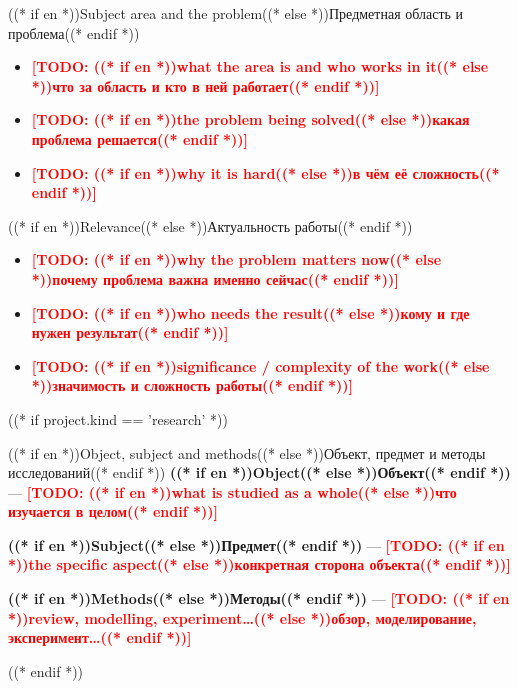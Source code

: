 \documentclass[aspectratio=169, 14pt]{beamer}
\newcommand{\todo}[1]{\textcolor{red}{\textbf{[TODO: #1]}}}
\begin{document}
\begin{frame}{((* if en *))Subject area and the problem((* else *))Предметная область и проблема((* endif *))}
  \begin{itemize}
    \item \todo{((* if en *))what the area is and who works in it((* else *))что за область и кто в ней работает((* endif *))}
    \item \todo{((* if en *))the problem being solved((* else *))какая проблема решается((* endif *))}
    \item \todo{((* if en *))why it is hard((* else *))в чём её сложность((* endif *))}
  \end{itemize}
\end{frame}

\begin{frame}{((* if en *))Relevance((* else *))Актуальность работы((* endif *))}
  \begin{itemize}
    \item \todo{((* if en *))why the problem matters now((* else *))почему проблема важна именно сейчас((* endif *))}
    \item \todo{((* if en *))who needs the result((* else *))кому и где нужен результат((* endif *))}
    \item \todo{((* if en *))significance / complexity of the work((* else *))значимость и сложность работы((* endif *))}
  \end{itemize}
\end{frame}

((* if project.kind == 'research' *))
\begin{frame}{((* if en *))Object, subject and methods((* else *))Объект, предмет и методы исследований((* endif *))}
  \textcolor{hseblue}{\textbf{((* if en *))Object((* else *))Объект((* endif *))}} — \todo{((* if en *))what is studied as a whole((* else *))что изучается в целом((* endif *))}

  \smallskip
  \textcolor{hseblue}{\textbf{((* if en *))Subject((* else *))Предмет((* endif *))}} — \todo{((* if en *))the specific aspect((* else *))конкретная сторона объекта((* endif *))}

  \smallskip
  \textcolor{hseblue}{\textbf{((* if en *))Methods((* else *))Методы((* endif *))}} — \todo{((* if en *))review, modelling, experiment…((* else *))обзор, моделирование, эксперимент…((* endif *))}
\end{frame}
((* endif *))
\end{document}
